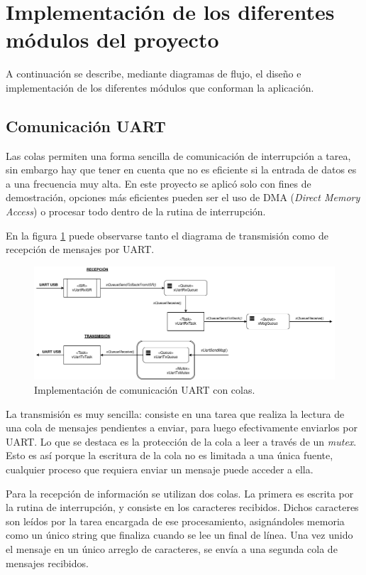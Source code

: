 \documentclass{IEEEtran}
\begin{document}
\section{Implementación de los diferentes módulos del proyecto}
\label{sec:modulos}

A continuación se describe, mediante diagramas de flujo, el diseño e implementación de los diferentes módulos que conforman la aplicación.

\subsection{Comunicación UART}
\label{sec:uart}
Las colas permiten una forma sencilla de comunicación de interrupción a tarea, sin embargo hay que tener en cuenta que no es eficiente si la entrada de datos es a una frecuencia muy alta. En este proyecto se aplicó solo con fines de demostración, opciones más eficientes pueden ser el uso de DMA (\textit{Direct Memory Access}) o procesar todo dentro de la rutina de interrupción.

En la figura \ref{fig:diagrama-uart} puede observarse tanto el diagrama de transmisión como de recepción de mensajes por UART.

\begin{figure}[ht]
    \centering
    \includegraphics[scale=0.5]{../diagrama_uart.png}
    \caption{Implementación de comunicación UART con colas.}
    \label{fig:diagrama-uart}
\end{figure}

La transmisión es muy sencilla: consiste en una tarea que realiza la lectura de una cola de mensajes pendientes a enviar, para luego efectivamente enviarlos por UART. Lo que se destaca es la protección de la cola a leer a través de un \textit{mutex}. Esto es así porque la escritura de la cola no es limitada a una única fuente, cualquier proceso que requiera enviar un mensaje puede acceder a ella.

Para la recepción de información se utilizan dos colas. La primera es escrita por la rutina de interrupción, y consiste en los caracteres recibidos. Dichos caracteres son leídos por la tarea encargada de ese procesamiento, asignándoles memoria como un único string que finaliza cuando se lee un final de línea. Una vez unido el mensaje en un único arreglo de caracteres, se envía a una segunda cola de mensajes recibidos.
\end{document}
